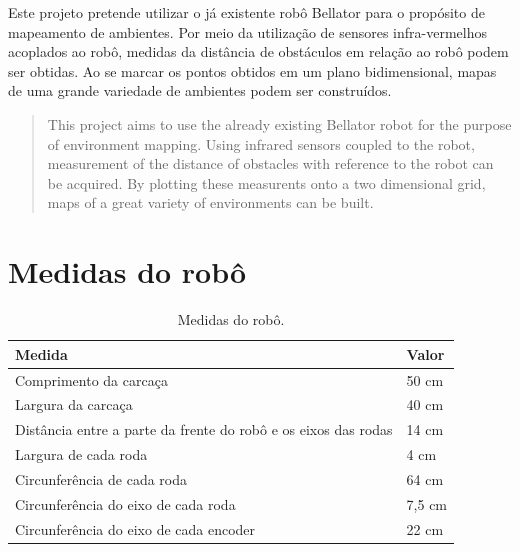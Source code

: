 \documentclass[oneside,a4paper,12pt]{normas-utf-tex}
\renewcommand{\toprule}{\midrule[\heavyrulewidth]}
\begin{document}
\capa
\folhaderosto

\begin{resumo}

Este projeto pretende utilizar o já existente robô Bellator para o propósito de mapeamento de ambientes. Por meio da utilização de sensores infra-vermelhos acoplados ao robô, medidas da distância de obstáculos em relação ao robô podem ser obtidas. Ao se marcar os pontos obtidos em um plano bidimensional, mapas de uma grande variedade de ambientes podem ser construídos.

\end{resumo}

\begin{abstract}

This project aims to use the already existing Bellator robot for the purpose of environment mapping. Using infrared sensors coupled to the robot, measurement of the distance of obstacles with reference to the robot can be acquired. By plotting these measurents onto a two dimensional grid, maps of a great variety of environments can be built.

\end{abstract}
\listadefiguras
\listadetabelas
\sumario













\apendice

\chapter{Medidas do robô}
\label{cap:medidas_robo}


\begin{table}[h]
  \caption{Medidas do robô.}
  \centering
  \begin{tabular}{l|l}
    \toprule
    \textbf{Medida} & \textbf{Valor} \\
    \midrule
    Comprimento da carcaça & 50 cm \\ \hline
    Largura da carcaça & 40 cm \\ \hline
    Distância entre a parte da frente do robô e os eixos das rodas & 14 cm \\ \hline
    Largura de cada roda & 4 cm \\ \hline
    Circunferência de cada roda & 64 cm \\ \hline
    Circunferência do eixo de cada roda & 7,5 cm \\ \hline
    Circunferência do eixo de cada encoder & 22 cm \\ 
    \bottomrule
  \end{tabular}
  \label{tab:medidas_robo}
\end{table}
\end{document}
